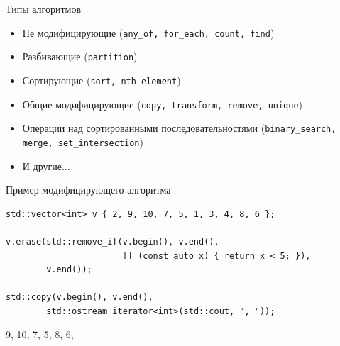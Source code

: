 \documentclass[unknownkeysallowed,xcolor=table]{beamer}
\begin{document}
\begin{frame}{Типы алгоритмов}

\begin{itemize}
  \item Не модифицирующие (\lstinline{any_of, for_each, count, find}) \vspace{1em}
  \item Разбивающие (\lstinline{partition}) \vspace{1em}
  \item Сортирующие (\lstinline{sort, nth_element}) \vspace{1em}
  \item Общие модифицирующие (\lstinline{copy, transform, remove, unique}) \vspace{1em}
  \item Операции над сортированными последовательностями (\lstinline{binary_search, merge, set_intersection}) \vspace{1em}
  \item И другие...
\end{itemize}

\end{frame}

\begin{frame}[fragile]{Пример модифицирующего алгоритма}

\begin{lstlisting}
std::vector<int> v { 2, 9, 10, 7, 5, 1, 3, 4, 8, 6 };

v.erase(std::remove_if(v.begin(), v.end(),
                       [] (const auto x) { return x < 5; }),
        v.end());
        
std::copy(v.begin(), v.end(),
        std::ostream_iterator<int>(std::cout, ", "));
\end{lstlisting}

\begin{cmdlinelarge}
9, 10, 7, 5, 8, 6,
\end{cmdlinelarge}

\end{frame}
\end{document}
